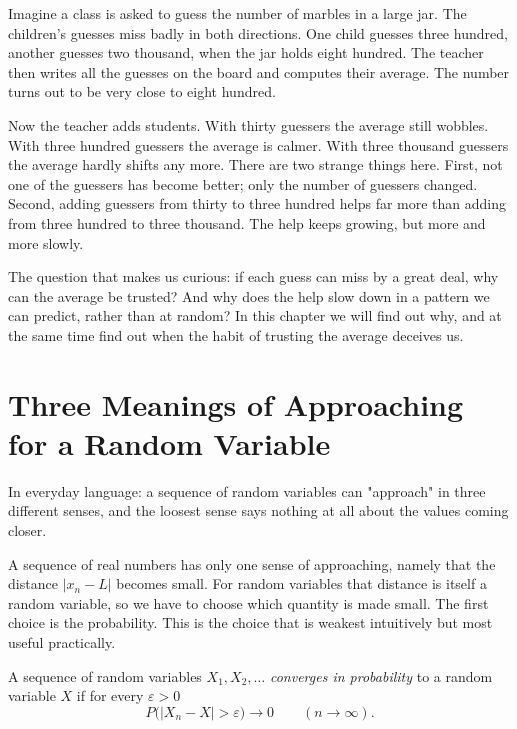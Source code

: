 \begin{untukanak}
Imagine a class is asked to guess the number of marbles in a large jar. The
children's guesses miss badly in both directions. One child guesses three hundred,
another guesses two thousand, when the jar holds eight hundred. The teacher then
writes all the guesses on the board and computes their average. The number turns
out to be very close to eight hundred.

Now the teacher adds students. With thirty guessers the average still wobbles. With
three hundred guessers the average is calmer. With three thousand guessers the
average hardly shifts any more. There are two strange things here. First, not one
of the guessers has become better; only the number of guessers changed. Second,
adding guessers from thirty to three hundred helps far more than adding from three
hundred to three thousand. The help keeps growing, but more and more slowly.

The question that makes us curious: if each guess can miss by a great deal, why
can the average be trusted? And why does the help slow down in a pattern we can
predict, rather than at random? In this chapter we will find out why, and at the
same time find out when the habit of trusting the average deceives us.
\end{untukanak}

\section{Three Meanings of Approaching for a Random Variable}

In everyday language: a sequence of random variables can "approach" in three
different senses, and the loosest sense says nothing at all about the values coming
closer.

A sequence of real numbers has only one sense of approaching, namely that the
distance $|x_n-L|$ becomes small. For random variables that distance is itself a
random variable, so we have to choose which quantity is made small. The first
choice is the probability. This is the choice that is weakest intuitively but most
useful practically.


\begin{definisi}
A sequence of random variables $X_1,X_2,\dots$ \emph{converges in probability}
 to a random variable $X$ if for every
$\varepsilon>0$
\[
P\bigl(|X_n-X|>\varepsilon\bigr)\to 0 \qquad (n\to\infty).
\]
\end{definisi}

